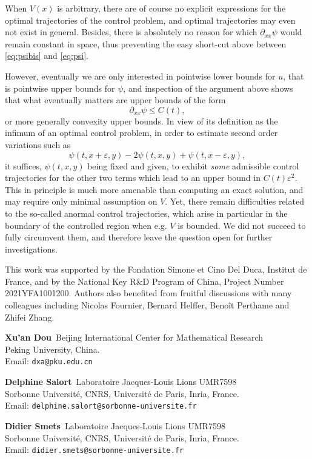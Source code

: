 \documentclass[12pt]{article}
\newcommand{\eps}{\varepsilon}
\begin{document}
\medskip

When $V(x)$ is arbitrary, there are of course no explicit expressions for the
optimal trajectories of the control problem, and optimal trajectories may even
not exist in general. Besides, there is absolutely no reason for which
$\partial_{xx} \psi$ would remain constant in space, thus preventing the easy
short-cut above between \eqref{eq:psibis} and \eqref{eq:psi}.

However, eventually we are only interested in pointwise lower bounds for $u$,
that is pointwise upper bounds for $\psi$, and inspection of the argument above 
shows that what eventually matters are upper bounds of the form 
$$
\partial_{xx} \psi \leq C(t),
$$
or more generally convexity upper bounds. In view of its definition as the
infimum of an optimal control problem, in order to estimate second order
variations such as 
$$
\psi(t, x+\eps, y) - 2\psi(t,x, y) + \psi(t,x-\eps, y),
$$
it suffices, $\psi(t,x,y)$ being fixed and given, to exhibit {\it some} admissible
control trajectories for the other two terms which lead to an upper bound in $C(t)\eps^2.$ This in
principle is much more amenable than computing an exact solution, and may
require only minimal assumption on $V$. Yet, there remain difficulties related
to the so-called anormal control trajectories, which arise in particular in the
boundary of the controlled region when e.g. $V$ is bounded. We did not succeed
to fully circumvent them, and therefore leave the question open for further 
investigations.

\medskip

This work was supported by the  Fondation Simone et Cino Del Duca, Institut de France, 
and by the National Key R\&D Program of China, Project Number 2021YFA1001200. 
Authors also benefited from fruitful discussions with many colleagues including 
Nicolas Fournier, Bernard Helffer, Benoît Perthame and Zhifei Zhang.






{\footnotesize 
\medskip\noindent
{\bf Xu'an Dou}\    
Beijing International Center for Mathematical Research\\
Peking University, China.\\
Email:\: {\tt dxa@pku.edu.cn}

\medskip\noindent
{\bf Delphine Salort}\ Laboratoire Jacques-Louis Lions UMR7598\\
Sorbonne Universit\'e, CNRS, Universit\'e de Paris, Inria, France.\\
Email:\: {\tt delphine.salort@sorbonne-universite.fr}

\medskip\noindent
{\bf Didier Smets}\ Laboratoire Jacques-Louis Lions UMR7598\\
Sorbonne Universit\'e, CNRS, Universit\'e de Paris, Inria, France.\\
Email:\: {\tt didier.smets@sorbonne-universite.fr}

}
\end{document}
